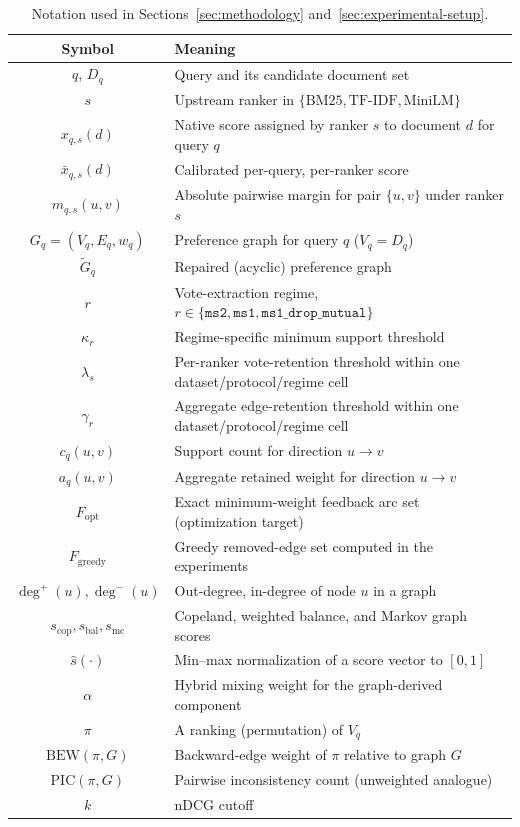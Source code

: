 \documentclass[manuscript,anonymous,review]{acmart}
\begin{document}
\begin{table}[t]
  \caption{Notation used in Sections~\ref{sec:methodology}
    and~\ref{sec:experimental-setup}.}
  \label{tab:notation}
  \begin{tabular}{cl}
    \toprule
    Symbol & Meaning \\
    \midrule
    $q$, $D_q$ & Query and its candidate document set \\
    $s$ & Upstream ranker in $\{\mathrm{BM25},\mathrm{TF\mbox{-}IDF},\mathrm{MiniLM}\}$ \\
    $x_{q,s}(d)$ & Native score assigned by ranker $s$ to document $d$ for query $q$ \\
    $\bar{x}_{q,s}(d)$ & Calibrated per-query, per-ranker score \\
    $m_{q,s}(u,v)$ & Absolute pairwise margin for pair $\{u,v\}$ under ranker $s$ \\
    $G_q=(V_q,E_q,w_q)$ & Preference graph for query $q$ ($V_q = D_q$) \\
    $\widetilde G_q$ & Repaired (acyclic) preference graph \\
    $r$ & Vote-extraction regime, $r\in\{\texttt{ms2},\texttt{ms1},\texttt{ms1\_drop\_mutual}\}$ \\
    $\kappa_r$ & Regime-specific minimum support threshold \\
    $\lambda_s$ & Per-ranker vote-retention threshold within one dataset/protocol/regime cell \\
    $\gamma_r$ & Aggregate edge-retention threshold within one dataset/protocol/regime cell \\
    $c_q(u,v)$ & Support count for direction $u \rightarrow v$ \\
    $a_q(u,v)$ & Aggregate retained weight for direction $u \rightarrow v$ \\
    $F_{\mathrm{opt}}$ & Exact minimum-weight feedback arc set (optimization target) \\
    $F_{\mathrm{greedy}}$ & Greedy removed-edge set computed in the experiments \\
    $\deg^+(u),\deg^-(u)$ & Out-degree, in-degree of node $u$ in a graph \\
    $s_{\mathrm{cop}}, s_{\mathrm{bal}}, s_{\mathrm{mc}}$ & Copeland, weighted balance, and Markov graph scores \\
    $\hat{s}(\cdot)$ & Min--max normalization of a score vector to $[0,1]$ \\
    $\alpha$ & Hybrid mixing weight for the graph-derived component \\
    $\pi$ & A ranking (permutation) of $V_q$ \\
    $\mathrm{BEW}(\pi,G)$ & Backward-edge weight of $\pi$ relative to graph $G$ \\
    $\mathrm{PIC}(\pi,G)$ & Pairwise inconsistency count (unweighted analogue) \\
    $k$ & nDCG cutoff \\
    \bottomrule
  \end{tabular}
\end{table}
\end{document}
